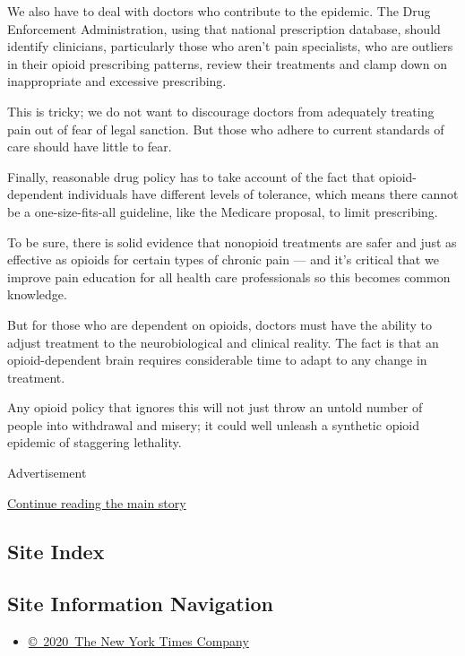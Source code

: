 We also have to deal with doctors who contribute to the epidemic. The
Drug Enforcement Administration, using that national prescription
database, should identify clinicians, particularly those who aren't pain
specialists, who are outliers in their opioid prescribing patterns,
review their treatments and clamp down on inappropriate and excessive
prescribing.

This is tricky; we do not want to discourage doctors from adequately
treating pain out of fear of legal sanction. But those who adhere to
current standards of care should have little to fear.

Finally, reasonable drug policy has to take account of the fact that
opioid-dependent individuals have different levels of tolerance, which
means there cannot be a one-size-fits-all guideline, like the Medicare
proposal, to limit prescribing.

To be sure, there is solid evidence that nonopioid treatments are safer
and just as effective as opioids for certain types of chronic pain ---
and it's critical that we improve pain education for all health care
professionals so this becomes common knowledge.

But for those who are dependent on opioids, doctors must have the
ability to adjust treatment to the neurobiological and clinical reality.
The fact is that an opioid-dependent brain requires considerable time to
adapt to any change in treatment.

Any opioid policy that ignores this will not just throw an untold number
of people into withdrawal and misery; it could well unleash a synthetic
opioid epidemic of staggering lethality.

Advertisement

\protect\hyperlink{after-bottom}{Continue reading the main story}

\hypertarget{site-index}{%
\subsection{Site Index}\label{site-index}}

\hypertarget{site-information-navigation}{%
\subsection{Site Information
Navigation}\label{site-information-navigation}}

\begin{itemize}
\tightlist
\item
  \href{https://help.nytimes3xbfgragh.onion/hc/en-us/articles/115014792127-Copyright-notice}{©~2020~The
  New York Times Company}
\end{itemize}

